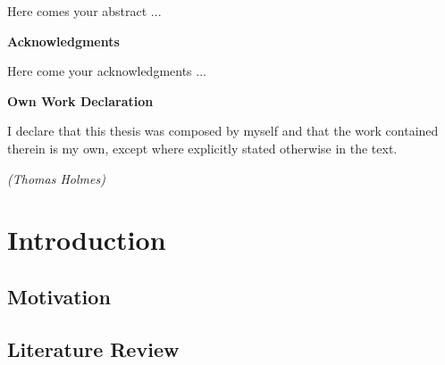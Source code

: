 \documentclass[11pt,twoside]{report}
\theoremstyle{definition}
\numberwithin{theorem}{section}
\numberwithin{definition}{section}
\numberwithin{lemma}{section}
\numberwithin{algorithm}{section}
\numberwithin{equation}{section}
\begin{document}
Here comes your abstract ...

\clearpage
\vspace*{10mm}
\begin{center}
\textbf{\huge{Acknowledgments}}
\end{center}

Here come your acknowledgments ...

\clearpage

\vspace*{10mm}
\begin{center}
\textbf{\huge{Own Work Declaration}}
\end{center}
\vspace*{20mm}

\noindent I declare that this thesis was composed by myself and that the work contained therein is my own, except where explicitly stated otherwise in the text.

\vspace*{10mm}

\begin{flushright}
\textit{(Thomas Holmes)}
\end{flushright}

\cleardoublepage



\pagestyle{plain}
\setcounter{page}{1}

\tableofcontents
\clearpage
\listoftables
\listoffigures
\cleardoublepage

\setcounter{page}{1}

\nocite{*}

\clearpage

\chapter{Introduction}
\section{Motivation}
\section{Literature Review}
\end{document}

